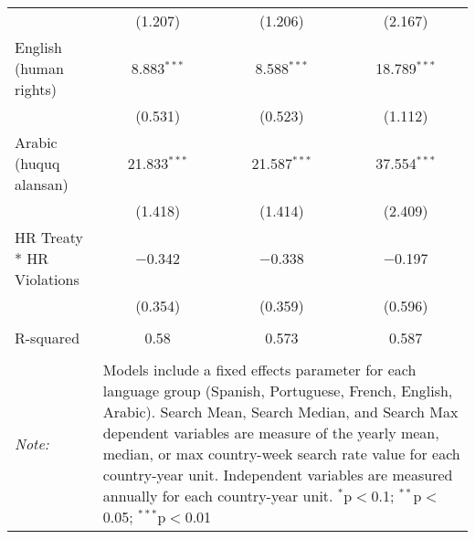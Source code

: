 \begin{table}[!htbp]
\begin{tabular}{@{\extracolsep{5pt}}lccc}
  & (1.207) & (1.206) & (2.167) \\ 
  English (human rights) & 8.883$^{***}$ & 8.588$^{***}$ & 18.789$^{***}$ \\ 
  & (0.531) & (0.523) & (1.112) \\ 
  Arabic (huquq alansan) & 21.833$^{***}$ & 21.587$^{***}$ & 37.554$^{***}$ \\ 
  & (1.418) & (1.414) & (2.409) \\ 
  HR Treaty * HR Violations & $-$0.342 & $-$0.338 & $-$0.197 \\ 
  & (0.354) & (0.359) & (0.596) \\ 
 \hline \\[-1.8ex] 
R-squared  & 0.58 & 0.573 & 0.587 \\ 
\hline 
\hline \\[-1.8ex] 
\textit{Note:}  & \multicolumn{3}{l}{\parbox[t]{8cm}{Models include a fixed effects parameter for each language group (Spanish, Portuguese, French, English, Arabic). Search Mean, Search Median, and Search Max dependent variables are measure of the yearly mean, median, or max country-week search rate value for each country-year unit. Independent variables are measured annually for each country-year unit. $^{*}$p$<$0.1; $^{**}$p$<$0.05; $^{***}$p$<$0.01}} \\ 
\end{tabular} 
\end{table} 
